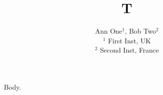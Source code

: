 \documentclass{svjour3}
\begin{document}
\title{T}
\author{Ann One$^{1}$, Bob Two$^{2}$ \\
        \small $^{1}$ First Inst, UK \\
        \small $^{2}$ Second Inst, France
}
\maketitle
Body.
\end{document}
